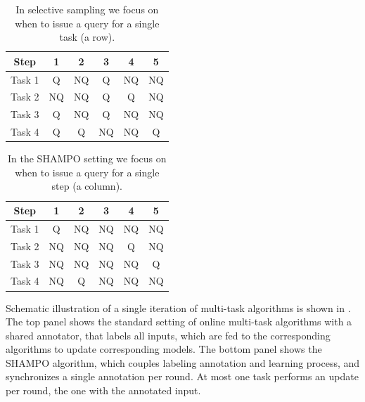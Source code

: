 \begin{table}[htdp]
\begin{center}
{
\centering
\begin{tabular}{|c c c c c c|} \hline
 Step &	1 &	2 &	3 &	4 &	5 \\  \hline
 Task 1 &	Q      &	NQ &	Q &	NQ &	NQ \\ \hline
 Task 2 &	NQ   &	NQ &	Q &	Q &	NQ \\ \hline
 Task 3 &	Q      &	 NQ &	Q &	NQ &	NQ \\ \hline
 Task 4 &	Q      &	Q &	NQ &	NQ &	Q \\ \hline
\end{tabular}
}
\end{center}
\caption{In selective sampling we focus on when to issue a query for a single task (a row).}
\label{tab:multitask_selective_sampling_example}
\end{table}

\begin{table}[htdp]
\begin{center}
{
\centering
\begin{tabular}{|c c c c c c|} \hline
 Step &	1 &	2 &	3 &	4 &	5 \\  \hline
 Task 1 &	Q &	  NQ &	NQ &	NQ &	NQ \\ \hline
 Task 2 &	NQ &	NQ &	NQ &	Q &	NQ \\ \hline
 Task 3 &	NQ &	 NQ &	NQ &	NQ &	Q \\ \hline
 Task 4 &	NQ &	Q &	NQ &	NQ &	NQ \\ \hline
\end{tabular}
}
\end{center}
\label{tab:multitask_SHAMPO_example} 
\caption{ In the SHAMPO setting we focus on when to issue a query for a single step (a column).}
\end{table}


Schematic illustration of a single iteration of multi-task algorithms is shown in . 
The top panel shows the standard setting of online multi-task algorithms with a shared annotator, that labels all inputs, which are fed to the corresponding algorithms to update corresponding models. The
bottom panel shows the SHAMPO algorithm, which couples labeling
annotation and learning process, and synchronizes a single annotation
per round.  At most one task performs an update per round, the one
with the annotated input.

